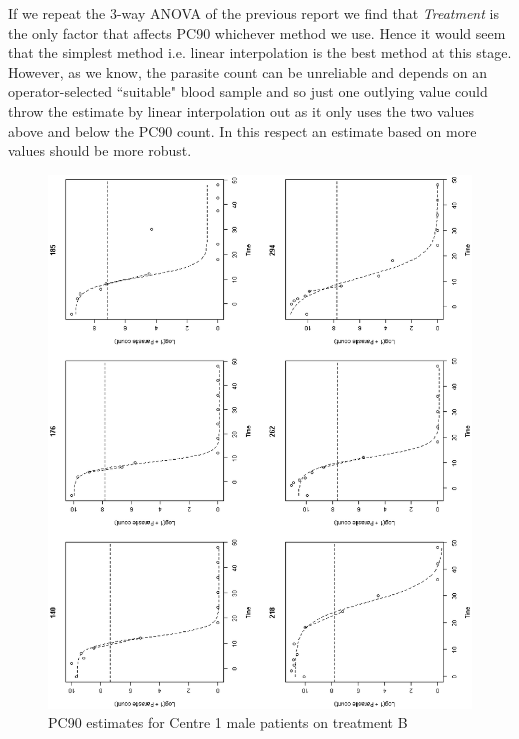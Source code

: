 If we repeat the 3-way ANOVA of the previous report we find that \emph{Treatment} is the only factor that affects PC90 whichever method we use. Hence it would seem that the simplest method i.e. linear interpolation is the best method at this stage. However, as we know, the parasite count can be unreliable and depends on an operator-selected ``suitable" blood sample and so just one outlying value could throw the estimate by linear interpolation out as it only uses the two values above and below the PC90 count. In this respect an estimate based on more values should be more robust.
\begin{figure}
\includegraphics[scale=0.55]{logistic-1MB.eps} 
\caption{PC90 estimates for Centre 1 male patients on treatment B}\label{1MB}
\end{figure}
